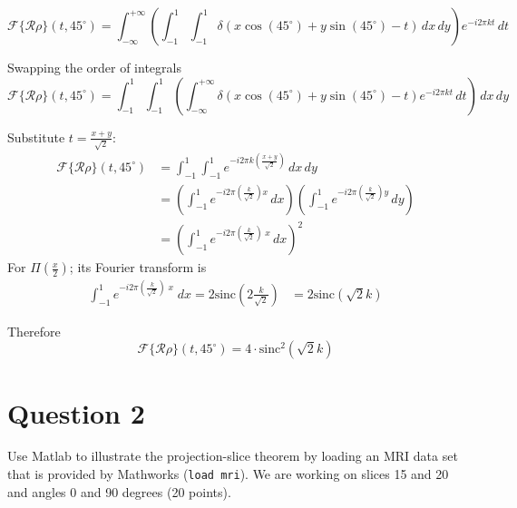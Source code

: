 \documentclass[12pt,twoside]{article}
\begin{document}
\begin{enumerate}
\[
\mathcal{F}\{\mathcal{R} \rho \}(t, 45^\circ) = \int_{-\infty}^{+\infty} \left( \int_{-1}^{1} \int_{-1}^{1} \delta(x \cos(45^\circ) + y \sin(45^\circ) - t) \, dx \, dy \right) e^{-i 2\pi k t} \, dt
\]

Swapping the order of integrals
\[
\mathcal{F}\{\mathcal{R} \rho \}(t, 45^\circ) = \int_{-1}^{1} \int_{-1}^{1} \left( \int_{-\infty}^{+\infty}  \delta(x \cos(45^\circ) + y \sin(45^\circ) - t)  e^{-i 2\pi k t} \, dt \right) \, dx \, dy 
\]


Substitute $t= \frac{x+y}{\sqrt{2}}$:
\begin{align*}
\mathcal{F}\{\mathcal{R} \rho \}(t, 45^\circ) &= \int_{-1}^{1} \int_{-1}^{1}   e^{-i 2\pi k \left( \frac{x+y}{\sqrt{2}} \right)}   \, dx \, dy \\
 &=  \left( \int_{-1}^{1}   e^{-i 2\pi \left( \frac{k}{\sqrt{2}} \right) x}   \, dx \right)  \left( \int_{-1}^{1}   e^{-i 2\pi \left( \frac{k}{\sqrt{2}} \right) y}   \, dy \right) \\
&=  \left( \int_{-1}^{1}   e^{-i 2\pi \left( \frac{k}{\sqrt{2}}  \right) \; x}   \, dx \right)^2
\end{align*}
For  $\Pi\left(\frac{x}{2}\right)$; its Fourier transform is
\begin{align*}
 \int_{-1}^{1}   e^{-i 2\pi \left( \frac{k}{\sqrt{2}}  \right) \; x}  \; dx  = 2  \text{sinc}(2 \frac{k}{\sqrt{2}})
  &= 2  \text{sinc}(\sqrt{2} k)
\end{align*}

Therefore
\[
\mathcal{F}\{\mathcal{R} \rho \}(t, 45^\circ) =  4 \cdot  \text{sinc}^2\left(\sqrt{2} k\right) 
\]


     \end{enumerate}
            
\section*{Question 2}

\noindent
Use Matlab to illustrate the projection-slice theorem by loading an MRI data set that is provided by Mathworks (\texttt{load mri}). 
We are working on slices 15 and 20 and angles 0 and 90 degrees (20 points).
\end{document}
